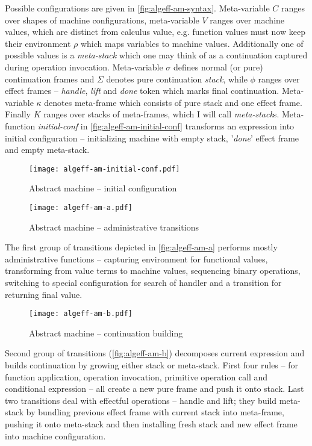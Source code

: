 \documentclass[inz, english, shortabstract]{iithesis}
\begin{document}
Possible configurations are given in \autoref{fig:algeff-am-syntax}.
Meta-variable $ C $ ranges over shapes of machine configurations, meta-variable $ V $ ranges over machine values, which are distinct from calculus value, e.g. function values must now keep their environment $ \rho $ which maps variables to machine values.
Additionally one of possible values is a \emph{meta-stack} which one may think of as a continuation captured during operation invocation.
Meta-variable $ \sigma $ defines normal (or pure) continuation frames and $ \Sigma $ denotes pure continuation \emph{stack}, while $ \phi $ ranges over effect frames -- \emph{handle}, \emph{lift} and \emph{done} token which marks final continuation.
Meta-variable $ \kappa $ denotes meta-frame which consists of pure stack and one effect frame.
Finally $ K $ ranges over stacks of meta-frames, which I will call \emph{meta-stack}s.
Meta-function \emph{initial-conf} in \autoref{fig:algeff-am-initial-conf} transforms an expression into initial configuration -- initializing machine with empty stack, '\emph{done}' effect frame and empty meta-stack.

\begin{figure}
  \centering
  \texttt{[image: algeff-am-initial-conf.pdf]}
  \caption{Abstract machine -- initial configuration}
  \label{fig:algeff-am-initial-conf}
\end{figure}

\begin{figure}[h]
  \centering
  \texttt{[image: algeff-am-a.pdf]} 
  \caption{Abstract machine -- administrative transitions}
  \label{fig:algeff-am-a}
\end{figure}

The first group of transitions depicted in \autoref{fig:algeff-am-a} performs mostly administrative functions -- capturing environment for functional values, transforming from value terms to machine values, sequencing binary operations, switching to special configuration for search of handler and a transition for returning final value.

\begin{figure}[h]
  \centering
  \texttt{[image: algeff-am-b.pdf]} 
  \caption{Abstract machine -- continuation building}
  \label{fig:algeff-am-b}
\end{figure}

Second group of transitions (\autoref{fig:algeff-am-b}) decomposes current expression and builds continuation by growing either stack or meta-stack.
First four rules -- for function application, operation invocation, primitive operation call and conditional expression -- all create a new pure frame and push it onto stack.
Last two transitions deal with effectful operations -- handle and lift; they build meta-stack by bundling previous effect frame with current stack into meta-frame, pushing it onto meta-stack and then installing fresh stack and new effect frame into machine configuration.
\end{document}
